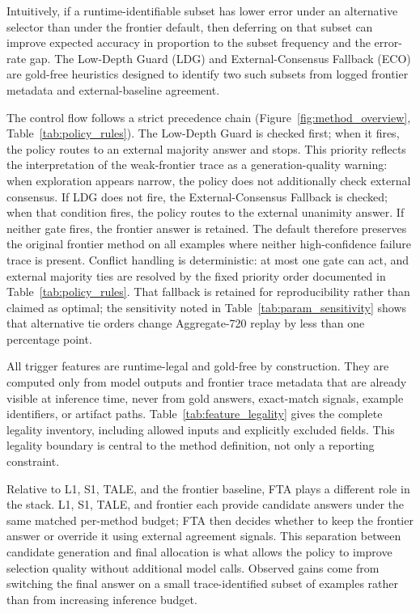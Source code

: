 Intuitively, if a runtime-identifiable subset has lower error under an
alternative selector than under the frontier default, then deferring on that
subset can improve expected accuracy in proportion to the subset frequency and
the error-rate gap. The Low-Depth Guard (LDG) and External-Consensus Fallback
(ECO) are gold-free heuristics designed to identify two such subsets from
logged frontier metadata and external-baseline agreement.

The control flow follows a strict precedence chain
(Figure~\ref{fig:method_overview}, Table~\ref{tab:policy_rules}).
The Low-Depth Guard is checked first; when it fires, the policy routes to an
external majority answer and stops.
This priority reflects the interpretation of the weak-frontier trace as a
generation-quality warning: when exploration appears narrow, the policy does
not additionally check external consensus.
If LDG does not fire, the External-Consensus Fallback is checked; when that
condition fires, the policy routes to the external unanimity answer.
If neither gate fires, the frontier answer is retained.
The default therefore preserves the original frontier method on all examples
where neither high-confidence failure trace is present.
Conflict handling is deterministic: at most one gate can act, and external
majority ties are resolved by the fixed priority order documented in
Table~\ref{tab:policy_rules}.
That fallback is retained for reproducibility rather than claimed as optimal;
the sensitivity noted in Table~\ref{tab:param_sensitivity} shows that
alternative tie orders change Aggregate-720 replay by less than one
percentage point.

All trigger features are runtime-legal and gold-free by construction.
They are computed only from model outputs and frontier trace metadata that are
already visible at inference time, never from gold answers, exact-match
signals, example identifiers, or artifact paths.
Table~\ref{tab:feature_legality} gives the complete legality inventory,
including allowed inputs and explicitly excluded fields.
This legality boundary is central to the method definition, not only a
reporting constraint.

Relative to L1, S1, TALE, and the frontier baseline, FTA plays a different
role in the stack.
L1, S1, TALE, and frontier each provide candidate answers under the same
matched per-method budget; FTA then decides whether to keep the frontier
answer or override it using external agreement signals.
This separation between candidate generation and final allocation is what
allows the policy to improve selection quality without additional model calls.
Observed gains come from switching the final answer on a small
trace-identified subset of examples rather than from increasing inference
budget.

